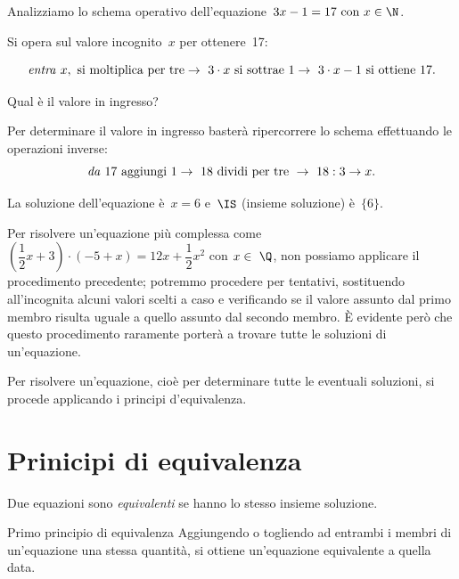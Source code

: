  \begin{esempio}{}{}
Analizziamo lo schema operativo dell'equazione~\(3x-1=17 \text{ con } 
x\in\N\).

Si opera sul valore incognito~\(x\) per ottenere~17:

\[\text{\emph{entra} } x,\text{ si moltiplica per tre}\to~3\cdot x%
\text{ si sottrae } 1\to~3\cdot x-1 \text{ si ottiene } 17.\]

Qual è il valore in ingresso?

Per determinare il valore in ingresso basterà ripercorrere lo schema
 effettuando le operazioni inverse:
\[\text{\emph{da} } 17 \text{ aggiungi } 1\to~18 \text{ dividi per tre 
}\to~18:3 
\to x.\]

La soluzione dell'equazione è~\(x = 6\) e~\(\IS\) (insieme
soluzione) è~\(\{6\}\).
 \end{esempio}


Per risolvere un'equazione più complessa come
\(\left(\dfrac{1}{2}x+3\right)\cdot (-5+x)=12x+\dfrac{1}{2}x^{2}\) con
\(x\in~\Q\), non possiamo applicare il procedimento precedente; potremmo
procedere per tentativi, sostituendo all'incognita
alcuni valori scelti a caso e verificando se il valore assunto dal
primo membro risulta uguale a quello assunto dal secondo membro. È
evidente però che questo procedimento raramente porterà a trovare
tutte le soluzioni di un'equazione.

\begin{osservazione}{}{}
Per risolvere un'equazione, cioè per determinare tutte
le eventuali soluzioni, si procede applicando i principi
d'equivalenza.
\end{osservazione}


\section{Prinicipi di equivalenza}
\label{sec:13_principi}

\begin{definizione}{}{}
 Due equazioni sono \emph{equivalenti} se hanno lo stesso insieme soluzione.
\end{definizione}

\begin{teorema}{Primo principio di equivalenza}{}
Aggiungendo o togliendo ad entrambi i membri di un'equazione 
una stessa quantità, 
si ottiene un'equazione equivalente a quella data.
\end{teorema}


